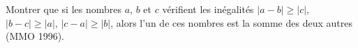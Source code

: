 Montrer que si les nombres $a$, $b$ et $c$ vérifient les inégalités $|a - b| \geq |c|$, $|b - c| \geq |a|$, $|c - a| \geq |b|$, alors l'un de ces nombres est la somme des deux autres (MMO 1996).
